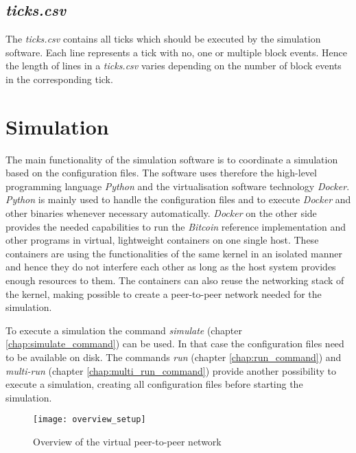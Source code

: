 \subsection{\textit{ticks.csv}}

The \textit{ticks.csv} contains all ticks which should be executed by the simulation software.
Each line represents a tick with no, one or multiple block events.
Hence the length of lines in a \textit{ticks.csv} varies depending on the number of block events in the corresponding tick.

\section{Simulation} \label{chap:simulation}

The main functionality of the simulation software is to coordinate a simulation based on the configuration files.
The software uses therefore the high-level programming language \textit{Python} and the virtualisation software technology \textit{Docker}.
\textit{Python} is mainly used to handle the configuration files and to execute \textit{Docker} and other binaries whenever necessary automatically.
\textit{Docker} on the other side provides the needed capabilities to run the \textit{Bitcoin} reference implementation and other programs in virtual, lightweight containers on one single host.
These containers are using the functionalities of the same kernel in an isolated manner and hence they do not interfere each other as long as the host system provides enough resources to them.
The containers can also reuse the networking stack of the kernel, making possible to create a peer-to-peer network needed for the simulation.
	
To execute a simulation the command \textit{simulate} (chapter \ref{chap:simulate_command}) can be used.
In that case the configuration files need to be available on disk.
The commands \textit{run} (chapter \ref{chap:run_command}) and \textit{multi-run} (chapter \ref{chap:multi_run_command}) provide another possibility to execute a simulation, creating all configuration files before starting the simulation. 

\begin{figure}[t]
\texttt{[image: overview\_setup]}
\centering
\caption{Overview of the virtual peer-to-peer network}
\label{fig:overview}
\end{figure}

